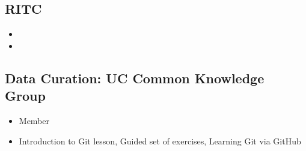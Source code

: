 
\subsection{RITC}

\begin{itemize}[label={}]
  \item
  \item
\end{itemize}

\subsection{Data Curation: UC Common Knowledge Group}
\begin{itemize}[label={}]
  \item Member
  \item Introduction to Git lesson, Guided set of exercises, Learning Git via GitHub 
\end{itemize}

